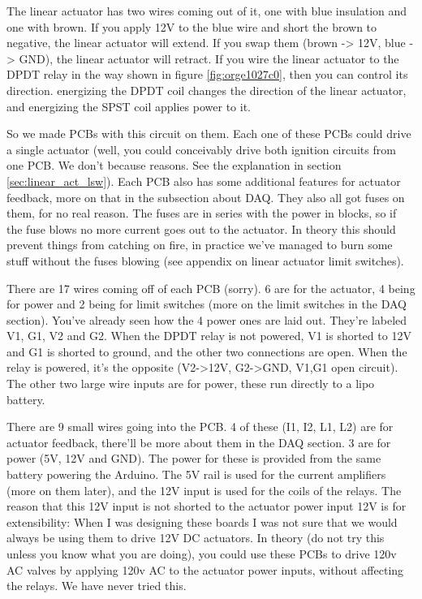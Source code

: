 \documentclass[11pt]{article}
\begin{document}
The linear actuator has two wires coming out of it, one with blue insulation and
one with brown. If you apply 12V to the blue wire and short the brown to
negative, the linear actuator will extend. If you swap them (brown -> 12V, blue
-> GND), the linear actuator will retract. If you wire the linear actuator to
the DPDT relay in the way shown in figure \ref{fig:orge1027c0}, then you can
control its direction. energizing the DPDT coil changes the direction of the
linear actuator, and energizing the SPST coil applies power to it.

So we made PCBs with this circuit on them. Each one of these PCBs could drive a
single actuator (well, you could conceivably drive both ignition circuits from
one PCB. We don't because reasons. See the explanation in section
\ref{sec:linear_act_lsw}). Each PCB also has some additional features for
actuator feedback, more on that in the subsection about DAQ. They also all got
fuses on them, for no real reason. The fuses are in series with the power in
blocks, so if the fuse blows no more current goes out to the actuator. In theory
this should prevent things from catching on fire, in practice we've managed to
burn some stuff without the fuses blowing (see appendix on linear actuator limit
switches).

There are 17 wires coming off of each PCB (sorry). 6 are for the actuator, 4
being for power and 2 being for limit switches (more on the limit switches in
the DAQ section). You've already seen how the 4 power ones are laid out. They're
labeled V1, G1, V2 and G2. When the DPDT relay is not powered, V1 is shorted to
12V and G1 is shorted to ground, and the other two connections are open. When
the relay is powered, it's the opposite (V2->12V, G2->GND, V1,G1 open
circuit). The other two large wire inputs are for power, these run directly to a
lipo battery.

There are 9 small wires going into the PCB. 4 of these (I1, I2, L1, L2) are for
actuator feedback, there'll be more about them in the DAQ section. 3 are for
power (5V, 12V and GND). The power for these is provided from the same battery
powering the Arduino. The 5V rail is used for the current amplifiers (more on
them later), and the 12V input is used for the coils of the relays. The reason
that this 12V input is not shorted to the actuator power input 12V is for
extensibility: When I was designing these boards I was not sure that we would
always be using them to drive 12V DC actuators. In theory (do not try this
unless you know what you are doing), you could use these PCBs to drive 120v AC
valves by applying 120v AC to the actuator power inputs, without affecting the
relays. We have never tried this.
\end{document}
